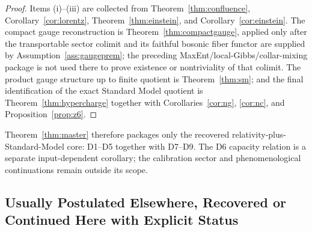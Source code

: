 \documentclass[11pt]{article}
\begin{document}
\begin{proof}
Items (i)--(iii) are collected from Theorem~\ref{thm:confluence}, Corollary~\ref{cor:lorentz}, Theorem~\ref{thm:einstein}, and Corollary~\ref{cor:einstein}. The compact gauge reconstruction is Theorem~\ref{thm:compactgauge}, applied only after the transportable sector colimit and its faithful bosonic fiber functor are supplied by Assumption~\ref{ass:gaugeprem}; the preceding MaxEnt/local-Gibbs/collar-mixing package is not used there to prove existence or nontriviality of that colimit. The product gauge structure up to finite quotient is Theorem~\ref{thm:sm}; and the final identification of the exact Standard Model quotient is Theorem~\ref{thm:hypercharge} together with Corollaries~\ref{cor:ng}, \ref{cor:nc}, and Proposition~\ref{prop:z6}.
\end{proof}

Theorem~\ref{thm:master} therefore packages only the recovered relativity-plus-Standard-Model core: D1--D5 together with D7--D9. The D6 capacity relation is a separate input-dependent corollary; the calibration sector and phenomenological continuations remain outside its scope.

\subsection*{Usually Postulated Elsewhere, Recovered or Continued Here with Explicit Status}
\end{document}
